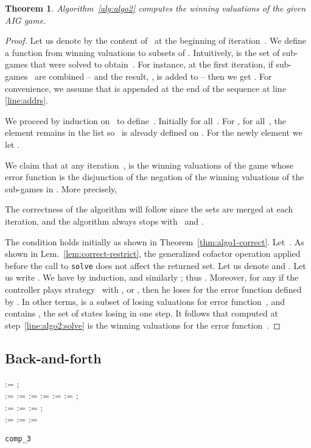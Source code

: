 \documentclass[submission,copyright,creativecommons]{eptcs}
\newtheorem{theorem}{Theorem}
\begin{document}
\begin{theorem}\label{thm:algo2-correct}
  Algorithm~\ref{alg:algo2} computes the winning valuations of the given AIG game.
\end{theorem}	
\begin{proof}
Let us denote by  the content of~ at the beginning
of iteration~.  We define a function  from winning valuations 
to subsets of .  Intuitively,  is the set of sub-games
that were solved to obtain~. For instance, at the first iteration, if
sub-games~ are combined -- and the result, , is added to  -- then we
get . For convenience, we assume that  is appended at the
end of the sequence  at line \ref{line:addrs}.

We proceed by induction on~ to define~.  Initially  for all~.  For , for all~, the
element  remains in the list so~ is already defined on .
For the newly element  we let .

We claim that at any iteration~,  is the winning valuations of the game
whose error function is the disjunction of the negation of the
winning valuations of the sub-games in . More precisely,

The correctness of the algorithm will follow since the sets  are
merged at each iteration, and the algorithm always stops with~ and .

The condition holds initially as shown in Theorem~\ref{thm:algo1-correct}.
Let~.  As shown in Lem.~\ref{lem:correct-restrict}, the generalized
cofactor operation applied before the call to \texttt{solve} does not affect the
returned set.  Let us denote  and .  Let us write .
We have  by induction, and similarly ; thus .  Moreover,
for any  if the controller plays strategy~
with , or , then he loses for the error
function defined by . In other terms,  is
a subset of losing valuations for error function~, and contains
, the set of states losing in one step.  It follows that
 computed at step~\ref{line:algo2:solve} is the winning valuations for
the error function~.
\end{proof}

\subsection{Back-and-forth}
\begin{algorithm}
\small
	 := ;
	\\
	\For{}
	{
		 := \;
		 := \;
                \label{alg3-loc:endofloop}
	}
	 := \;
	 := \;
	 := \;
	 := ;
	\\
	\While{}
	{
		 := \;
		 := \;
	  \label{line:upre}
		\For{}
		{
			 := ;
			\\
			\If{}
			{
				\lFor{}
				{
					 := 
				}
				 := \;
			}
		}
		 := \;
	}
	\Return \;
\caption{\texttt{comp\_3}}
\label{alg:algo3}
\end{algorithm}
\end{document}
